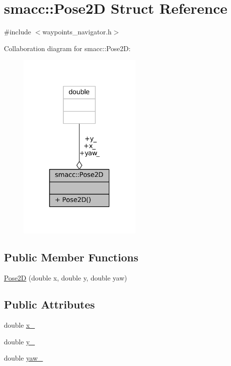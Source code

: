 \hypertarget{structsmacc_1_1Pose2D}{}\section{smacc\+:\+:Pose2D Struct Reference}
\label{structsmacc_1_1Pose2D}


{\ttfamily \#include $<$waypoints\+\_\+navigator.\+h$>$}



Collaboration diagram for smacc\+:\+:Pose2D\+:
\nopagebreak
\begin{figure}[H]
\begin{center}
\leavevmode
\includegraphics[width=171pt]{structsmacc_1_1Pose2D__coll__graph}
\end{center}
\end{figure}
\subsection*{Public Member Functions}
\begin{DoxyCompactItemize}
\item 
\hyperlink{structsmacc_1_1Pose2D_aa1e66bf9e0aaeccc866b030af445df76}{Pose2D} (double x, double y, double yaw)
\end{DoxyCompactItemize}
\subsection*{Public Attributes}
\begin{DoxyCompactItemize}
\item 
double \hyperlink{structsmacc_1_1Pose2D_a8f876eecc29329305779a9fbe5e827bb}{x\+\_\+}
\item 
double \hyperlink{structsmacc_1_1Pose2D_a29508b823676c1591fb5969858f1193a}{y\+\_\+}
\item 
double \hyperlink{structsmacc_1_1Pose2D_a79f207f922e6eed40846e6443456f7ba}{yaw\+\_\+}
\end{DoxyCompactItemize}


